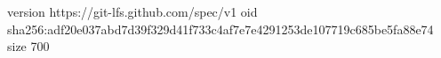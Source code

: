 version https://git-lfs.github.com/spec/v1
oid sha256:adf20e037abd7d39f329d41f733c4af7e7e4291253de107719c685be5fa88e74
size 700
